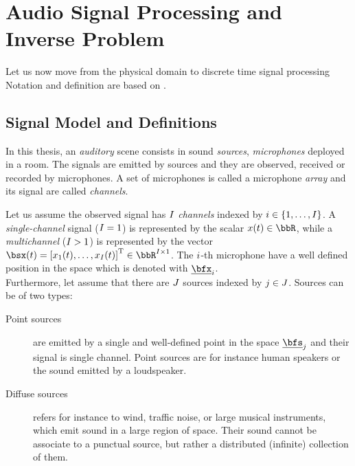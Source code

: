 \chapter{Audio Signal Processing and Inverse Problem}\label{ch:processing}
\vspace{-2.5em}
 Let us now move from the physical domain to discrete time
signal processing
\blindtext[1]
Notation and definition are based on \cite{gannot2017consolidated}.

\section{Signal Model and Definitions}\label{sec:processing:model}
In this thesis, an \textit{auditory} scene consists in sound \textit{sources}, \textit{microphones} deployed in a room.
The signals are emitted by sources and they are observed, received or recorded by microphones.
A set of microphones is called a microphone \textit{array} and its signal are called \textit{channels}.

Let us assume the observed signal has $I$ \textit{channels} indexed by $\idxMic \in \kbrace{1,\dots,\numMics}$.
A \textit{single-channel} signal ($I = 1$) is represented by the scalar $\mic(t) \in \bbR$,
while a \textit{multichannel} ($I >   1$) is represented by the vector
$\mics(t) = \ktranspose{\klist{\mic_1(t), \dots, \mic_{\numMics}(t)}} \in \bbR^{\numMics \times 1}$.
The $i$-th microphone have a well defined position in the space which is denoted with $\positionMicrophone_\idxMic$.
\\Furthermore, let assume that there are $J$ sources indexed by $j \in J$.
Sources can be of two types:
\begin{description}
    \item[Point sources] are emitted by a single and well-defined point in the space $\positionSource_\idxSrc$ and their signal is single channel.
    Point sources are for instance human speakers or the sound emitted by a loudspeaker.
    \item[Diffuse sources] refers for instance to wind, traffic noise, or large musical instruments, which emit sound in a large region of space.
    Their sound cannot be associate to a punctual source, but rather a distributed (infinite) collection of them.
\end{description}

